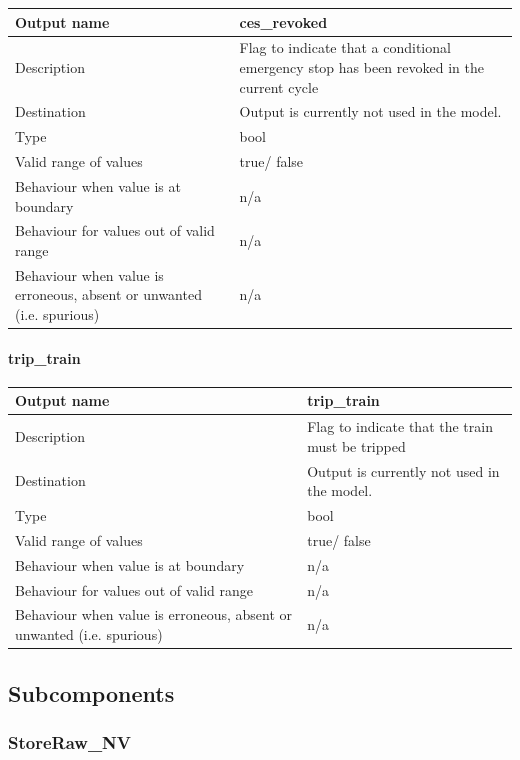 \begin{longtable}{p{}p{}}
\toprule
Output name				& ces\_revoked \\
\midrule
Description				& Flag to indicate that a conditional emergency stop has been revoked in the current cycle \\
\midrule
Destination				& Output is currently not used in the model.  \\ 
\midrule
Type					& bool\\
\midrule
Valid range of values	& true/ false \\
\midrule
Behaviour when value is at boundary	& n/a  \\
\midrule
Behaviour for values out of valid range	& n/a  \\
\midrule
Behaviour when value is erroneous, absent or unwanted (i.e. spurious) & n/a  \\
\bottomrule
\end{longtable}

\paragraph{trip\_train}

\begin{longtable}{p{}p{}}
\toprule
Output name				& trip\_train \\
\midrule
Description				& Flag to indicate that the train must be tripped \\
\midrule
Destination				& Output is currently not used in the model.\\ 
\midrule
Type					& bool\\
\midrule
Valid range of values	& true/ false \\
\midrule
Behaviour when value is at boundary	& n/a  \\
\midrule
Behaviour for values out of valid range	& n/a  \\
\midrule
Behaviour when value is erroneous, absent or unwanted (i.e. spurious) & n/a  \\
\bottomrule
\end{longtable}


\subsection{Subcomponents}\label{s:manage_track_data_subcomponents}

\subsubsection{StoreRaw\_NV}


